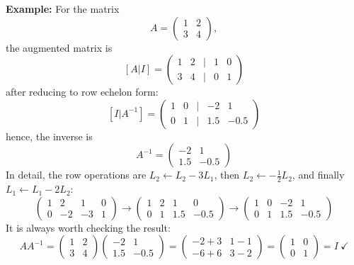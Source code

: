 \documentclass[]{article}
\begin{document}
	\noindent \textbf{Example:} For the matrix
	$$
	A = \begin{pmatrix} 1 & 2 \\ 3 & 4 \end{pmatrix},
	$$
	the augmented matrix is
	$$
	[A | I] = \begin{pmatrix}
		1 & 2 & \mid & 1 & 0\\
		3 & 4 & \mid & 0 & 1
	\end{pmatrix}
	$$
	after reducing to row echelon form:
	$$
	[I | A^{-1}] = \begin{pmatrix}
		1 & 0 & \mid & -2 & 1\\
		0 & 1 & \mid & 1.5 & -0.5
	\end{pmatrix}
	$$
	hence, the inverse is
	$$
	A^{-1} = \begin{pmatrix}
		-2 & 1\\
		1.5 & -0.5
	\end{pmatrix}
	$$
	In detail, the row operations are $L_2 \leftarrow L_2 - 3L_1$, then $L_2 \leftarrow -\frac{1}{2}L_2$, and finally $L_1 \leftarrow L_1 - 2L_2$:
	$$
	\left(\begin{array}{cc|cc}
		1 & 2 & 1 & 0\\
		0 & -2 & -3 & 1
	\end{array}\right)
	\longrightarrow
	\left(\begin{array}{cc|cc}
		1 & 2 & 1 & 0\\
		0 & 1 & 1.5 & -0.5
	\end{array}\right)
	\longrightarrow
	\left(\begin{array}{cc|cc}
		1 & 0 & -2 & 1\\
		0 & 1 & 1.5 & -0.5
	\end{array}\right)
	$$
	It is always worth checking the result:
	$$
	A A^{-1} = \begin{pmatrix} 1 & 2 \\ 3 & 4 \end{pmatrix}\begin{pmatrix} -2 & 1\\ 1.5 & -0.5 \end{pmatrix}
	= \begin{pmatrix} -2+3 & 1-1 \\ -6+6 & 3-2 \end{pmatrix}
	= \begin{pmatrix} 1 & 0 \\ 0 & 1 \end{pmatrix} = I \ \checkmark
	$$
\end{document}
